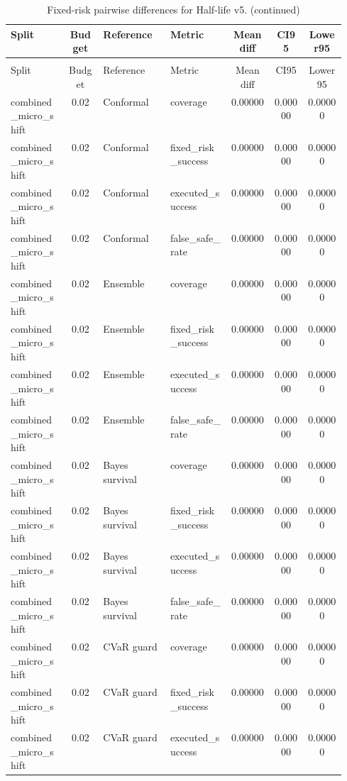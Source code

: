 \documentclass{article}
\begin{document}
\begin{center}
\scriptsize
\begin{longtable}{p{0.17\linewidth}cp{0.20\linewidth}p{0.18\linewidth}ccc}
\caption{Fixed-risk pairwise differences for Half-life v5.}\label{tab:fixed-pairwise}\\
\toprule
Split & Budget & Reference & Metric & Mean diff & CI95 & Lower95\\
\midrule
\endfirsthead
\caption[]{Fixed-risk pairwise differences for Half-life v5. (continued)}\\
\toprule
Split & Budget & Reference & Metric & Mean diff & CI95 & Lower95\\
\midrule
\endhead
combined\_micro\_shift & 0.02 & Conformal & coverage & 0.00000 & 0.00000 & 0.00000\\
combined\_micro\_shift & 0.02 & Conformal & fixed\_risk\_success & 0.00000 & 0.00000 & 0.00000\\
combined\_micro\_shift & 0.02 & Conformal & executed\_success & 0.00000 & 0.00000 & 0.00000\\
combined\_micro\_shift & 0.02 & Conformal & false\_safe\_rate & 0.00000 & 0.00000 & 0.00000\\
combined\_micro\_shift & 0.02 & Ensemble & coverage & 0.00000 & 0.00000 & 0.00000\\
combined\_micro\_shift & 0.02 & Ensemble & fixed\_risk\_success & 0.00000 & 0.00000 & 0.00000\\
combined\_micro\_shift & 0.02 & Ensemble & executed\_success & 0.00000 & 0.00000 & 0.00000\\
combined\_micro\_shift & 0.02 & Ensemble & false\_safe\_rate & 0.00000 & 0.00000 & 0.00000\\
combined\_micro\_shift & 0.02 & Bayes survival & coverage & 0.00000 & 0.00000 & 0.00000\\
combined\_micro\_shift & 0.02 & Bayes survival & fixed\_risk\_success & 0.00000 & 0.00000 & 0.00000\\
combined\_micro\_shift & 0.02 & Bayes survival & executed\_success & 0.00000 & 0.00000 & 0.00000\\
combined\_micro\_shift & 0.02 & Bayes survival & false\_safe\_rate & 0.00000 & 0.00000 & 0.00000\\
combined\_micro\_shift & 0.02 & CVaR guard & coverage & 0.00000 & 0.00000 & 0.00000\\
combined\_micro\_shift & 0.02 & CVaR guard & fixed\_risk\_success & 0.00000 & 0.00000 & 0.00000\\
combined\_micro\_shift & 0.02 & CVaR guard & executed\_success & 0.00000 & 0.00000 & 0.00000\\

\end{longtable}
\end{center}
\end{document}

